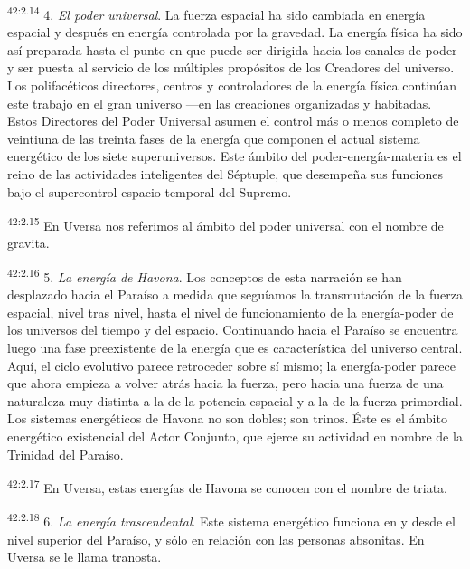 \par
\textsuperscript{42:2.14} 4. \textit{El poder universal}. La fuerza espacial ha sido cambiada en energía espacial y después en energía controlada por la gravedad. La energía física ha sido así preparada hasta el punto en que puede ser dirigida hacia los canales de poder y ser puesta al servicio de los múltiples propósitos de los Creadores del universo. Los polifacéticos directores, centros y controladores de la energía física continúan este trabajo en el gran universo ---en las creaciones organizadas y habitadas. Estos Directores del Poder Universal asumen el control más o menos completo de veintiuna de las treinta fases de la energía que componen el actual sistema energético de los siete superuniversos. Este ámbito del poder-energía-materia es el reino de las actividades inteligentes del Séptuple, que desempeña sus funciones bajo el supercontrol espacio-temporal del Supremo.

\par
\textsuperscript{42:2.15} En Uversa nos referimos al ámbito del poder universal con el nombre de gravita.

\par
\textsuperscript{42:2.16} 5. \textit{La energía de Havona}. Los conceptos de esta narración se han desplazado hacia el Paraíso a medida que seguíamos la transmutación de la fuerza espacial, nivel tras nivel, hasta el nivel de funcionamiento de la energía-poder de los universos del tiempo y del espacio. Continuando hacia el Paraíso se encuentra luego una fase preexistente de la energía que es característica del universo central. Aquí, el ciclo evolutivo parece retroceder sobre sí mismo; la energía-poder parece que ahora empieza a volver atrás hacia la fuerza, pero hacia una fuerza de una naturaleza muy distinta a la de la potencia espacial y a la de la fuerza primordial. Los sistemas energéticos de Havona no son dobles; son trinos. Éste es el ámbito energético existencial del Actor Conjunto, que ejerce su actividad en nombre de la Trinidad del Paraíso.

\par
\textsuperscript{42:2.17} En Uversa, estas energías de Havona se conocen con el nombre de triata.

\par
\textsuperscript{42:2.18} 6. \textit{La energía trascendental}. Este sistema energético funciona en y desde el nivel superior del Paraíso, y sólo en relación con las personas absonitas. En Uversa se le llama tranosta.

